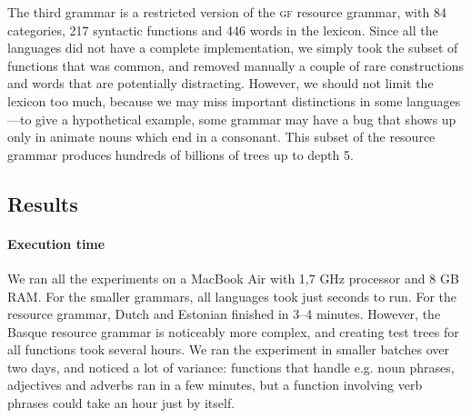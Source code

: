 \documentclass[11pt]{article}
\def\t#1{\texttt{#1}}
\def\gf{\textsc{gf}}
\begin{document}


The third grammar is a restricted version of the \gf{} resource grammar,
with 84 categories, 217 syntactic functions and 446 words in the
lexicon. Since all the languages did not have a complete
implementation, we simply took the subset of functions that was
common, and removed manually a couple of rare constructions and words
that are potentially distracting. However, we should not limit the
lexicon too much, because we may miss important distinctions 
in some languages---to give a hypothetical example, some grammar may
have a bug that shows up only in animate nouns which end in a
consonant. This subset of the resource grammar produces hundreds of
billions of trees up to depth 5. 

\subsection{Results}

\paragraph{Execution time} We ran all the experiments on a MacBook Air with 1,7 GHz processor and 8 GB RAM.
For the smaller grammars, all languages took just
seconds to run. For the resource grammar, Dutch and Estonian finished in
3--4 minutes.
However, the Basque resource grammar is noticeably more complex, and
creating test trees for all functions took several hours. We ran the
experiment in smaller batches over two days, and noticed a lot of
variance: functions that handle e.g. noun phrases, adjectives and
adverbs ran in a few minutes, but a function involving verb phrases
could take an hour just by itself. 


\end{document}
